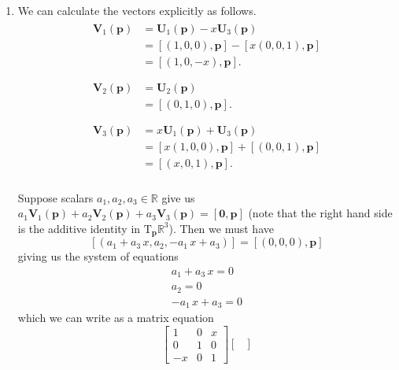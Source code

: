 \documentclass[12 pt, letterpaper]{hmcpset}
\begin{document}
\begin{solution}
	\begin{enumerate}
		\item 
			We can calculate the vectors explicitly as follows.
			\[
				\begin{gathered}
					\begin{split}
						\mathbf V_1(\mathbf p) & = \mathbf U_1(\mathbf p) - x \mathbf U_3(\mathbf p) \\
								       & = [(1, 0, 0), \mathbf p] - [x (0, 0, 1), \mathbf p] \\
								       & = [(1, 0, - x), \mathbf p].
					\end{split}\\\\
					\begin{split}
						\mathbf V_2(\mathbf p) & = \mathbf U_2(\mathbf p) \\
								       & = [(0, 1, 0), \mathbf p].
					\end{split}\\\\
					\begin{split}
						\mathbf V_3(\mathbf p) & = x \mathbf U_1(\mathbf p) + \mathbf U_3(\mathbf p) \\
								       & = [x (1, 0, 0), \mathbf p] + [(0, 0, 1), \mathbf p] \\
								       & = [(x, 0, 1), \mathbf p].
					\end{split}
				\end{gathered}
			\]\\
			Suppose scalars $a_1, a_2, a_3 \in \mathbb R$ give us $a_1 \mathbf V_1(\mathbf p) + a_2 \mathbf V_2(\mathbf p) + a_3 \mathbf V_3(\mathbf p) = [\mathbf 0, \mathbf p]$ (note that the right hand side is the additive identity in $\mathrm T_{\mathbf p} \mathbb R^3$). Then we must have
			\[
				[(a_1 + a_3 \, x, a_2, - a_1 \, x + a_3)] = [(0, 0, 0), \mathbf p]
			\]
			giving us the system of equations
			\[
				\begin{gathered}
					a_1 + a_3 \, x = 0 \\
					a_2 = 0 \\
					-a_1 \, x + a_3 = 0
				\end{gathered}
			\]
			which we can write as a matrix equation
			\[
				\begin{bmatrix}
					1 & 0 & x \\
					0 & 1 & 0 \\
					-x & 0 & 1
					\end{bmatrix} \begin{bmatrix}

\end{bmatrix}\]
\end{enumerate}
\end{solution}
\end{document}
